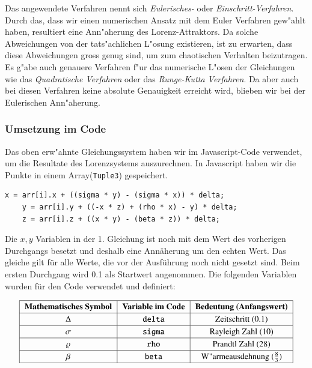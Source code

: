 Das angewendete Verfahren nennt sich \textit{Eulerisches-} oder \textit{Einschritt-Verfahren}. Durch das, dass wir einen numerischen Ansatz mit dem Euler Verfahren gew"ahlt haben, resultiert eine Ann"aherung des Lorenz-Attraktors. Da solche Abweichungen von der tats"achlichen L"osung existieren, ist zu erwarten, dass diese Abweichungen gross genug sind, um zum chaotischen Verhalten beizutragen. Es g"abe auch genauere Verfahren f"ur das numerische L"osen der Gleichungen wie das \textit{Quadratische Verfahren} oder das \textit{Runge-Kutta Verfahren}. Da aber auch bei diesen Verfahren keine absolute Genauigkeit erreicht wird, blieben wir bei der Eulerischen Ann"aherung. 

\subsubsection{Umsetzung im Code}

Das oben erw"ahnte Gleichungssystem haben wir im Javascript-Code verwendet, um die Resultate des Lorenzsystems auszurechnen. In Javascript haben wir die Punkte in einem Array(\texttt{Tuple3}) gespeichert.

	\begin{lstlisting}[style=C]
	x = arr[i].x + ((sigma * y) - (sigma * x)) * delta;
	y = arr[i].y + ((-x * z) + (rho * x) - y) * delta;
	z = arr[i].z + ((x * y) - (beta * z)) * delta;
	\end{lstlisting}

Die $ x, y $ Variablen in der 1. Gleichung ist noch mit dem Wert des vorherigen Durchgangs besetzt und deshalb eine Annäherung um den echten Wert. Das gleiche gilt für alle Werte, die vor der Ausführung noch nicht gesetzt sind. Beim ersten Durchgang wird 0.1 als Startwert angenommen. Die folgenden Variablen wurden für den Code verwendet und definiert:

\begin{align}
{\renewcommand{\arraystretch}{1.2}
	\begin{tabular}{| c | c | c |}
		\hline
		\textbf{Mathematisches Symbol} & \textbf{Variable im Code} & \textbf{Bedeutung (Anfangswert)}\\\hline
		$ \Delta $ & \texttt{delta} & Zeitschritt (0.1) \\\hline
		$ \sigma $ & \texttt{sigma} & Rayleigh Zahl (10)\\\hline
		$\varrho $ & \texttt{rho} & Prandtl Zahl (28)\\\hline
		$\beta $ & \texttt{beta}  & W"armeausdehnung ($\frac{8}{3}$)\\\hline
	\end{tabular}
}
\end{align}

